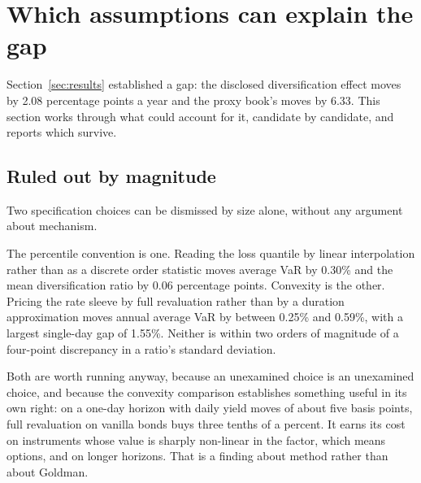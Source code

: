 %

\section{Which assumptions can explain the gap}\label{sec:assumptions}

Section~\ref{sec:results} established a gap: the disclosed diversification
effect moves by 2.08 percentage points a year and the proxy book's moves by
6.33. This section works through what could account for it, candidate by
candidate, and reports which survive.

\subsection{Ruled out by magnitude}

Two specification choices can be dismissed by size alone, without any argument
about mechanism.

The percentile convention is one. Reading the loss quantile by linear
interpolation rather than as a discrete order statistic moves average VaR by
0.30\% and the mean diversification ratio by 0.06 percentage points. Convexity
is the other. Pricing the rate sleeve by full revaluation rather than by a
duration approximation moves annual average VaR by between 0.25\% and 0.59\%,
with a largest single-day gap of 1.55\%. Neither is within two orders of
magnitude of a four-point discrepancy in a ratio's standard deviation.

Both are worth running anyway, because an unexamined choice is an unexamined
choice, and because the convexity comparison establishes something useful in
its own right: on a one-day horizon with daily yield moves of about five basis
points, full revaluation on vanilla bonds buys three tenths of a percent. It
earns its cost on instruments whose value is sharply non-linear in the factor,
which means options, and on longer horizons. That is a finding about method
rather than about Goldman.

